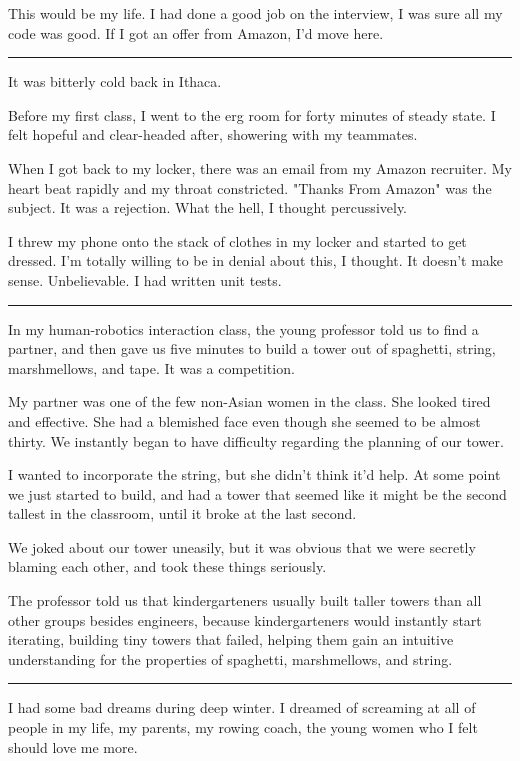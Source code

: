 This would be my life.  I had done a good job on the interview, I was sure all
my code was good.  If I got an offer from Amazon, I'd move here. 

\plainfancybreak{12pt}{2}{* * *}

It was bitterly cold back in Ithaca.

Before my first class, I went to the erg room for forty minutes of steady state.
I felt hopeful and clear-headed after, showering with my teammates.

When I got back to my locker, there was an email from my Amazon recruiter.  My
heart beat rapidly and my throat constricted.  "Thanks From Amazon" was the
subject.  It was a rejection.  What the hell, I thought percussively. 

I threw my phone onto the stack of clothes in my locker and started to get
dressed.  I'm totally willing to be in denial about this, I thought.  It doesn't
make sense.  Unbelievable.  I had written unit tests.

\plainfancybreak{12pt}{2}{* * *}

In my human-robotics interaction class, the young professor told us to find a
partner, and then gave us five minutes to build a tower out of spaghetti,
string, marshmellows, and tape.  It was a competition.

My partner was one of the few non-Asian women in the class.  She looked tired
and effective.  She had a blemished face even though she seemed to be almost
thirty.  We instantly began to have difficulty regarding the planning of our
tower.  

I wanted to incorporate the string, but she didn't think it'd help.  At some
point we just started to build, and had a tower that seemed like it might be the
second tallest in the classroom, until it broke at the last second.

We joked about our tower uneasily, but it was obvious that we were secretly
blaming each other, and took these things seriously.

The professor told us that kindergarteners usually built taller towers than all
other groups besides engineers, because kindergarteners would instantly start
iterating, building tiny towers that failed, helping them gain an intuitive
understanding for the properties of spaghetti, marshmellows, and string. 

\plainfancybreak{12pt}{2}{* * *}

I had some bad dreams during deep winter.  I dreamed of screaming at all of
people in my life, my parents, my rowing coach, the young women who I felt
should love me more.  

